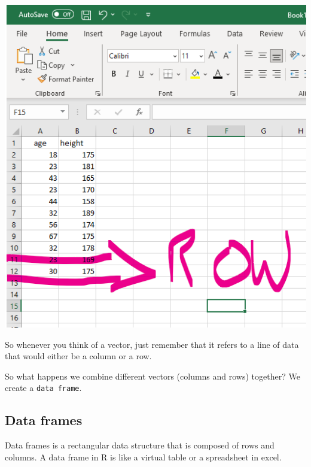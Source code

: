 \documentclass[
]{book}
\begin{document}
\includegraphics{img/03-row-vector.png}

So whenever you think of a vector, just remember that it refers to a line of data that would either be a column or a row.

So what happens we combine different vectors (columns and rows) together? We create a \texttt{data\ frame}.

\hypertarget{data-frames}{%
\subsection{Data frames}\label{data-frames}}

Data frames is a rectangular data structure that is composed of rows and columns. A data frame in R is like a virtual table or a spreadsheet in excel.
\end{document}
